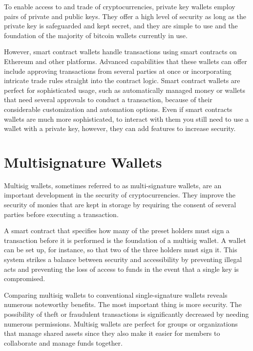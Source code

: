 To enable access to and trade of cryptocurrencies, private key wallets employ pairs of private and public keys. They offer a high level of security as long as the private key is safeguarded and kept secret, and they are simple to use and the foundation of the majority of bitcoin wallets currently in use.

However, smart contract wallets handle transactions using smart contracts on Ethereum and other platforms. Advanced capabilities that these wallets can offer include approving transactions from several parties at once or incorporating intricate trade rules straight into the contract logic. Smart contract wallets are perfect for sophisticated usage, such as automatically managed money or wallets that need several approvals to conduct a transaction, because of their considerable customization and automation options. Even if smart contracts wallets are much more sophisticated, to interact with them you still need to use a wallet with a private key, however, they can add features to increase security.

 \section{Multisignature Wallets}
\label{sec:ch2sec5} 
Multisig wallets, sometimes referred to as multi-signature wallets, are an important development in the security of cryptocurrencies. They improve the security of monies that are kept in storage by requiring the consent of several parties before executing a transaction.

A smart contract that specifies how many of the preset holders must sign a transaction before it is performed is the foundation of a multisig wallet. A wallet can be set up, for instance, so that two of the three holders must sign it. This system strikes a balance between security and accessibility by preventing illegal acts and preventing the loss of access to funds in the event that a single key is compromised.

Comparing multisig wallets to conventional single-signature wallets reveals numerous noteworthy benefits. The most important thing is more security. The possibility of theft or fraudulent transactions is significantly decreased by needing numerous permissions. Multisig wallets are perfect for groups or organizations that manage shared assets since they also make it easier for members to collaborate and manage funds together.